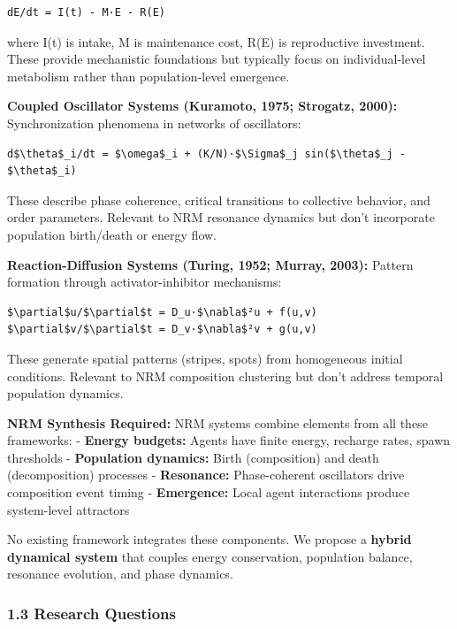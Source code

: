 \documentclass[
]{article}
\begin{document}
\begin{verbatim}
dE/dt = I(t) - M·E - R(E)
\end{verbatim}

where I(t) is intake, M is maintenance cost, R(E) is reproductive
investment. These provide mechanistic foundations but typically focus on
individual-level metabolism rather than population-level emergence.

\textbf{Coupled Oscillator Systems (Kuramoto, 1975; Strogatz, 2000):}
Synchronization phenomena in networks of oscillators:

\begin{verbatim}
d$\theta$_i/dt = $\omega$_i + (K/N)·$\Sigma$_j sin($\theta$_j - $\theta$_i)
\end{verbatim}

These describe phase coherence, critical transitions to collective
behavior, and order parameters. Relevant to NRM resonance dynamics but
don't incorporate population birth/death or energy flow.

\textbf{Reaction-Diffusion Systems (Turing, 1952; Murray, 2003):}
Pattern formation through activator-inhibitor mechanisms:

\begin{verbatim}
$\partial$u/$\partial$t = D_u·$\nabla$²u + f(u,v)
$\partial$v/$\partial$t = D_v·$\nabla$²v + g(u,v)
\end{verbatim}

These generate spatial patterns (stripes, spots) from homogeneous
initial conditions. Relevant to NRM composition clustering but don't
address temporal population dynamics.

\textbf{NRM Synthesis Required:} NRM systems combine elements from all
these frameworks: - \textbf{Energy budgets:} Agents have finite energy,
recharge rates, spawn thresholds - \textbf{Population dynamics:} Birth
(composition) and death (decomposition) processes - \textbf{Resonance:}
Phase-coherent oscillators drive composition event timing -
\textbf{Emergence:} Local agent interactions produce system-level
attractors

No existing framework integrates these components. We propose a
\textbf{hybrid dynamical system} that couples energy conservation,
population balance, resonance evolution, and phase dynamics.

\subsubsection{1.3 Research Questions}\label{research-questions}
\end{document}
